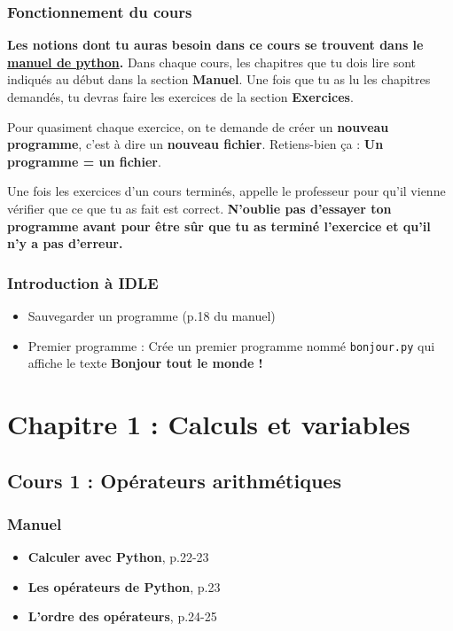 \documentclass[11pt]{article}
\begin{document}
\subsubsection*{Fonctionnement du cours}
\label{sec:orgca61d9e}
\textbf{Les notions dont tu auras besoin dans ce cours se trouvent dans le \href{manuel/manuel\_python.pdf}{manuel de python}.} Dans chaque cours, les chapitres que tu dois lire sont indiqués au début dans la section \textbf{Manuel}. Une fois que tu as lu les chapitres demandés, tu devras faire les exercices de la section \textbf{Exercices}.

Pour quasiment chaque exercice, on te demande de créer un \textbf{nouveau programme}, c'est à dire un \textbf{nouveau fichier}. Retiens-bien ça : \textbf{Un programme = un fichier}.

Une fois les exercices d'un cours terminés, appelle le professeur pour qu'il vienne vérifier que ce que tu as fait est correct. \textbf{N'oublie pas d'essayer ton programme avant pour être sûr que tu as terminé l'exercice et qu'il n'y a pas d'erreur.}
\subsubsection*{Introduction à IDLE}
\label{sec:orgd209d30}
\begin{itemize}
\item Sauvegarder un programme (p.18 du manuel)
\item Premier programme : Crée un premier programme nommé \texttt{bonjour.py} qui affiche le texte \textbf{\og Bonjour tout le monde !\fg{}}
\end{itemize}

\section*{Chapitre 1 : Calculs et variables}
\label{chapitre1}
\subsection*{Cours 1 : Opérateurs arithmétiques}
\label{chapitre1_cours1}
\subsubsection*{Manuel}
\label{sec:orgc89b974}
\begin{itemize}
\item \textbf{\og Calculer avec Python\fg{}}, p.22-23
\item \textbf{\og Les opérateurs de Python\fg{}}, p.23
\item \textbf{\og L'ordre des opérateurs\fg{}}, p.24-25
\end{itemize}
\end{document}
